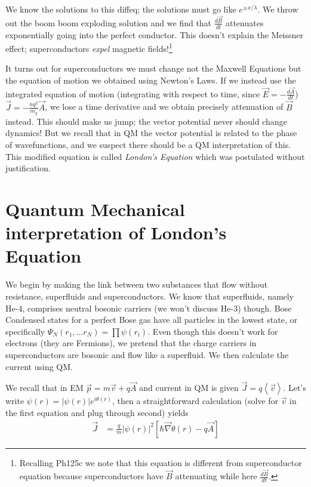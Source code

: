 \documentclass[10pt]{report}
\newcommand{\rd}[2]{\frac{d#1}{d#2}}
\newcommand{\abs}[1]{\left|#1\right|}
\newcommand{\expvalue}[1]{\left<#1\right>}
\begin{document}
We know the solutions to this diffeq; the solutions must go like $e^{\pm x/\lambda}$. We throw out the boom boom exploding solution and we find that $\rd{\vec{B}}{t}$ attenuates exponentially going into the perfect conductor. This doesn't explain the Meissner effect; superconductors \emph{expel} magnetic fields!\footnote{Recalling Ph125c we note that this equation is different from superconductor equation because superconductors have $\vec{B}$ attenuating while here $\rd{\vec{B}}{t}$.}

It turns out for superconductors we must change not the Maxwell Equations but the equation of motion we obtained using Newton's Laws. If we instead use the integrated equation of motion (integrating with respect to time, since $\vec{E} = -\rd{\vec{A}}{t}$) $\vec{J} = -\frac{nq^2}{m_q}\vec{A}$, we lose a time derivative and we obtain precisely attenuation of $\vec{B}$ instead. This should make us jump; the vector potential never should change dynamics! But we recall that in QM the vector potential is related to the phase of wavefunctions, and we suspect there should be a QM interpretation of this. This modified equation is called \emph{London's Equation} which was postulated without justification. 

\section{Quantum Mechanical interpretation of London's Equation}

We begin by making the link between two substances that flow without resistance, superfluids and superconductors. We know that superfluids, namely He-4, comprises neutral bosonic carriers (we won't discuss He-3) though. Bose Condensed states for a perfect Bose gas have all particles in the lowest state, or specifically $\Psi_N(r_1,\dots r_N) = \prod \psi(r_i)$. Even though this doesn't work for electrons (they are Fermions), we pretend that the charge carriers in superconductors are bosonic and flow like a superfluid. We then calculate the current using QM. 

We recall that in EM $\vec{p} = m\vec{v} + q\vec{A}$ and current in QM is given $\vec{J} = q\expvalue{\vec{v}}$. Let's write $\psi(r) = \abs{\psi(r)}e^{i\theta(r)}$, then a straightforward calculation (solve for $\vec{v}$ in the first equation and plug through second) yields
\begin{align}
    \vec{J} &= \frac{q}{m}\abs{\psi(r)}^2 \left[ \hbar \vec{\nabla}\theta(r) - q\vec{A} \right]
\end{align} 
\end{document}
